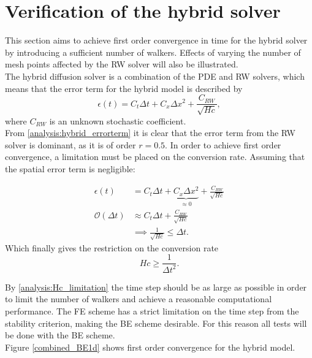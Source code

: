\section{Verification of the hybrid solver}
\noindent This section aims to achieve first order convergence in time for the hybrid solver by introducing a sufficient number of walkers. 
Effects of varying the number of mesh points affected by the RW solver will also be illustrated. \\

The hybrid diffusion solver is a combination of the PDE and RW solvers, which means that the error term for the hybrid model is described by 
\begin{equation}\label{analysis:hybrid_errorterm}
 \epsilon(t) = C_t \Delta t + C_x \Delta x^2 + \frac{C_{RW}}{\sqrt{Hc}},
\end{equation}
where $C_{RW}$ is an unknown stochastic coefficient.\\

\noindent From \eqref{analysis:hybrid_errorterm} it is clear that the error term from the RW solver is dominant, as it is of order $r=0.5$. 
In order to achieve first order convergence, a limitation must be placed on the conversion rate. 
Assuming that the spatial error term is negligible: 

\begin{align}
 \epsilon(t) &= C_t \Delta t + \underbrace{C_x \Delta x^2}_{\approx 0} + \frac{C_{RW}}{\sqrt{Hc}}\\
 \mathcal O(\Delta t) &\approx C_t \Delta t + \frac{C_{RW}}{\sqrt{Hc}} \\
 &\implies  \frac{1}{\sqrt{Hc}} \leq \Delta t.
\end{align}
Which finally gives the restriction on the conversion rate
\begin{equation}\label{analysis:Hc_limitation}
 Hc\geq\frac{1}{\Delta t^2}.
\end{equation}

\noindent By \eqref{analysis:Hc_limitation} the time step should be as large as possible in order to limit the number of walkers and achieve a reasonable computational performance. 
The FE scheme has a strict limitation on the time step from the stability criterion, making the BE scheme desirable. 
For this reason all tests will be done with the BE scheme. \\
Figure \ref{combined_BE1d} shows first order convergence for the hybrid model.


